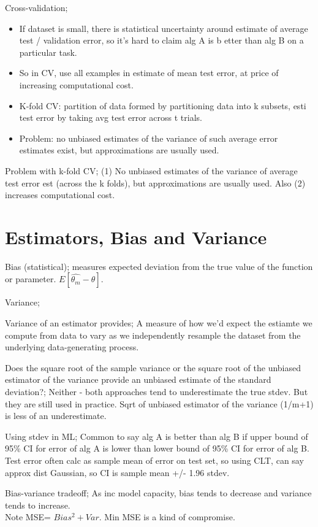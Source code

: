 \documentclass{article}
\begin{document}
Cross-validation; \begin{itemize} \item If dataset is small, there is statistical uncertainty around estimate of average test / validation error, so it's hard to claim alg A is b etter than alg B on a particular task.  \item So in CV, use all examples in estimate of mean test error, at price of increasing computational cost.  \item K-fold CV: partition of data formed by partitioning data into k subsets, esti test error by taking avg test error across t trials.  \item Problem: no unbiased estimates of the variance of such average error estimates exist, but approximations are usually used.  \end{itemize}

Problem with k-fold CV; (1) No unbiased estimates of the variance of average test error est (across the k folds), but approximations are usually used. Also (2) increases computational cost.


\section{Estimators, Bias and Variance}

Bias (statistical); measures expected deviation from the true value of the function or parameter. $E[\hat{\theta_m}-\theta]$.

Variance;

Variance of an estimator provides; A measure of how we'd expect the estiamte we compute from data to vary as we independently resample the dataset from the underlying data-generating process.

Does the square root of the sample variance or the square root of the unbiased estimator of the variance provide an unbiased estimate of the standard deviation?; Neither - both approaches tend to underestimate the true stdev. But they are still used in practice. Sqrt of unbiased estimator of the variance (1/m+1) is less of an underestimate.

Using stdev in ML; Common to say alg A is better than alg B if upper bound of 95\% CI for error of alg A is lower than lower bound of 95\% CI for error of alg B. \\ Test error often calc as sample mean of error on test set, so using CLT, can say approx dist Gaussian, so CI is sample mean +/- 1.96 stdev.

Bias-variance tradeoff; As inc model capacity, bias tends to decrease and variance tends to increase. \\ Note MSE= $Bias^2 + Var$. Min MSE is a kind of compromise.
\end{document}
